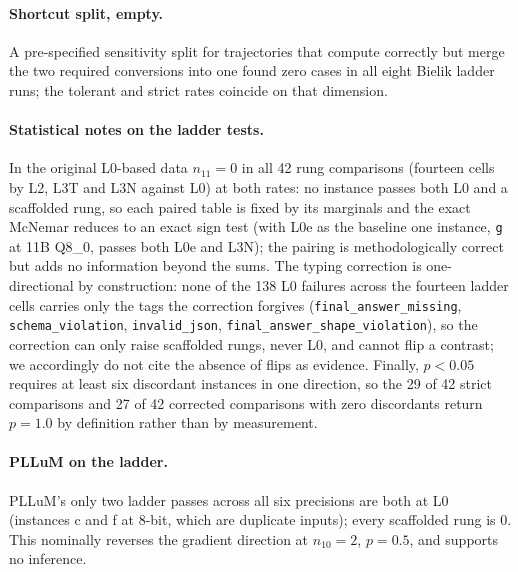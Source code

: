 \documentclass[11pt]{article}
\begin{document}
\paragraph{Shortcut split, empty.} A pre-specified sensitivity split for trajectories that compute correctly but merge the two required conversions into one found zero cases in all eight Bielik ladder runs; the tolerant and strict rates coincide on that dimension.

\paragraph{Statistical notes on the ladder tests.} In the original L0-based data $n_{11}=0$ in all 42 rung comparisons (fourteen cells by L2, L3T and L3N against L0) at both rates: no instance passes both L0 and a scaffolded rung, so each paired table is fixed by its marginals and the exact McNemar reduces to an exact sign test (with L0e as the baseline one instance, \texttt{g} at 11B Q8\_0, passes both L0e and L3N); the pairing is methodologically correct but adds no information beyond the sums. The typing correction is one-directional by construction: none of the 138 L0 failures across the fourteen ladder cells carries only the tags the correction forgives (\texttt{final\_answer\_missing}, \texttt{schema\_violation}, \texttt{invalid\_json}, \texttt{final\_answer\_shape\_violation}), so the correction can only raise scaffolded rungs, never L0, and cannot flip a contrast; we accordingly do not cite the absence of flips as evidence. Finally, $p<0.05$ requires at least six discordant instances in one direction, so the 29 of 42 strict comparisons and 27 of 42 corrected comparisons with zero discordants return $p=1.0$ by definition rather than by measurement.

\paragraph{PLLuM on the ladder.} PLLuM's only two ladder passes across all six precisions are both at L0 (instances c and f at 8-bit, which are duplicate inputs); every scaffolded rung is 0. This nominally reverses the gradient direction at $n_{10}=2$, $p=0.5$, and supports no inference.
\end{document}
